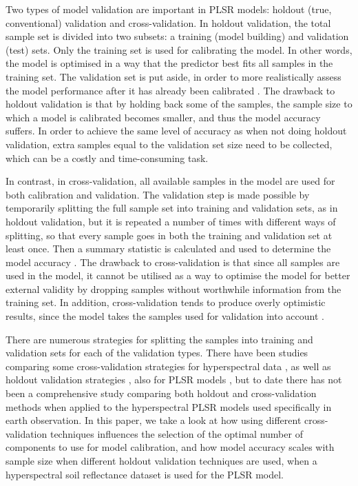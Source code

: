 \documentclass{isprs}
\begin{document}
Two types of model validation are important in PLSR models: holdout (true, conventional) validation and cross-validation. In holdout validation, the total sample set is divided into two subsets: a training (model building) and validation (test) sets. Only the training set is used for calibrating the model. In other words, the model is optimised in a way that the predictor best fits all samples in the training set. The validation set is put aside, in order to more realistically assess the model performance after it has already been calibrated \cite{kohavi1995study}. The drawback to holdout validation is that by holding back some of the samples, the sample size to which a model is calibrated becomes smaller, and thus the model accuracy suffers. In order to achieve the same level of accuracy as when not doing holdout validation, extra samples equal to the validation set size need to be collected, which can be a costly and time-consuming task.

In contrast, in cross-validation, all available samples in the model are used for both calibration and validation. The validation step is made possible by temporarily splitting the full sample set into training and validation sets, as in holdout validation, but it is repeated a number of times with different ways of splitting, so that every sample goes in both the training and validation set at least once. Then a summary statistic is calculated and used to determine the model accuracy \cite{kohavi1995study}. The drawback to cross-validation is that since all samples are used in the model, it cannot be utilised as a way to optimise the model for better external validity by dropping samples without worthwhile information from the training set. In addition, cross-validation tends to produce overly optimistic results, since the model takes the samples used for validation into account \cite{clark2003boosted}.

There are numerous strategies for splitting the samples into training and validation sets for each of the validation types. There have been studies comparing some cross-validation strategies for hyperspectral data \cite{molinaro2005prediction}, as well as holdout validation strategies \cite{roy2008exploring}, also for PLSR models \cite{clark2003boosted}, but to date there has not been a comprehensive study comparing both holdout and cross-validation methods when applied to the hyperspectral PLSR models used specifically in earth observation. In this paper, we take a look at how using different cross-validation techniques influences the selection of the optimal number of components to use for model calibration, and how model accuracy scales with sample size when different holdout validation techniques are used, when a hyperspectral soil reflectance dataset is used for the PLSR model.
\end{document}

